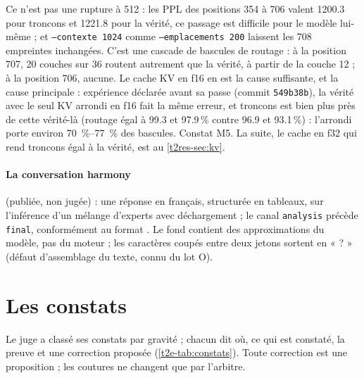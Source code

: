 Ce n'est pas une rupture à 512 : les PPL des positions 354 à 706 valent \num{1200.3} pour troncons et \num{1221.8} pour la vérité, ce passage est difficile pour le modèle lui-même ; et \texttt{--contexte 1024} comme \texttt{--emplacements 200} laissent les 708 empreintes inchangées. C'est une cascade de bascules de routage : à la position 707, 20 couches sur 36 routent autrement que la vérité, à partir de la couche 12 ; à la position 706, aucune. Le cache KV en f16 en est la cause suffisante, et la cause principale : expérience déclarée avant sa passe (commit \texttt{549b38b}), la vérité avec le seul KV arrondi en f16 fait la même erreur, et troncons est bien plus près de cette vérité-là (routage égal à \num{99.3} et \num{97.9}\,\% contre \num{96.9} et \num{93.1}\,\%) : l'arrondi porte environ \SIrange{70}{77}{\percent} des bascules. Constat M5. La suite, le cache en f32 qui rend troncons égal à la vérité, est au \cref{t2res-sec:kv}.

\paragraph{La conversation harmony} (publiée, non jugée) : une réponse en français, structurée en tableaux, sur l'inférence d'un mélange d'experts avec déchargement ; le canal \texttt{analysis} précède \texttt{final}, conformément au format \cite{openai2025harmony}. Le fond contient des approximations du modèle, pas du moteur ; les caractères coupés entre deux jetons sortent en « \textsf{?} » (défaut d'assemblage du texte, connu du lot O).

\section{Les constats}\label{t2e-sec:constats}

Le juge a classé ses constats par gravité ; chacun dit où, ce qui est constaté, la preuve et une correction proposée (\cref{t2e-tab:constats}). Toute correction est une proposition ; les coutures ne changent que par l'arbitre.

